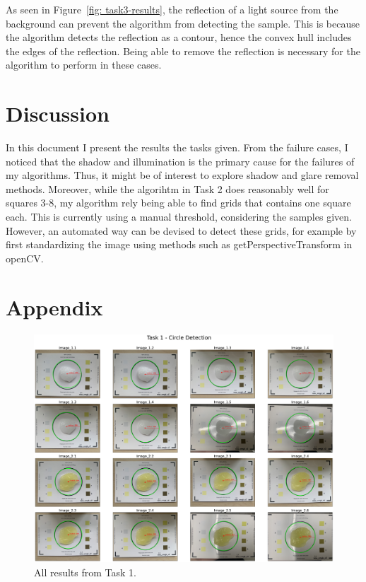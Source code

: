 \documentclass[12pt]{article}
\begin{document}
As seen in Figure~\ref{fig: task3-results}, the reflection of a light source from the background can prevent the algorithm from detecting the sample. This is because the algorithm detects the reflection as a contour, hence the convex hull includes the edges of the reflection. Being able to remove the reflection is necessary for the algorithm to perform in these cases.

\section{Discussion}
In this document I present the results the tasks given. From the failure cases, I noticed that the shadow and illumination is the primary cause for the failures of my algorithms. Thus, it might be of interest to explore shadow and glare removal methods. Moreover, while the algorihtm in Task 2 does reasonably well for squares 3-8, my algorithm rely being able to find grids that contains one square each. This is currently using a manual threshold, considering the samples given. However, an automated way can be devised to detect these grids, for example by first standardizing the image using methods such as getPerspectiveTransform in openCV.

\newpage
\section{Appendix}

\begin{figure}[h]
    \centerline{\includegraphics[width=\textwidth]{figs/task1.pdf}} 
	\caption{All results from Task 1.}
	\label{fig: task1-all}
\end{figure}
\end{document}
